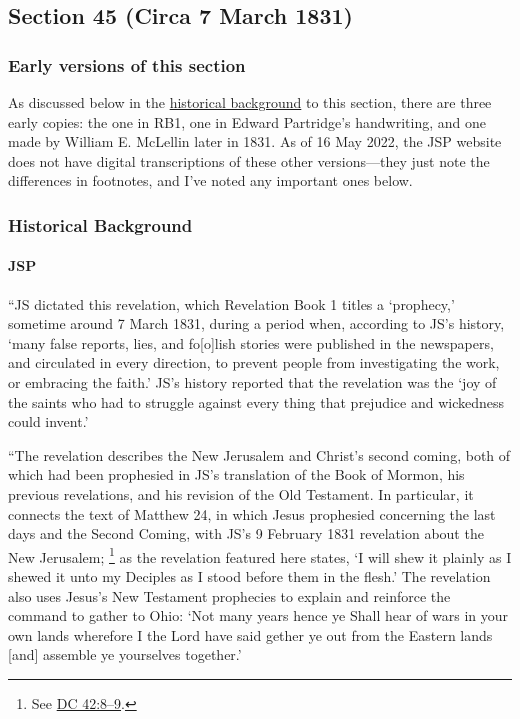 \subsection{Section 45 (Circa 7 March 1831)}
	\label{DC45}
	
	\subsubsection{Early versions of this section}
	
		As discussed below in the \hyperref[DC45-HB]{historical background} to this section, there are three early copies: the one in RB1, one in Edward Partridge's handwriting, and one made by William E. McLellin later in 1831. As of 16 May 2022, the JSP website does not have digital transcriptions of these other versions---they just note the differences in footnotes, and I've noted any important ones below.
	
	\subsubsection{Historical Background}
		\label{DC45-HB}
		
		\paragraph{JSP}
		
			``JS dictated this revelation, which Revelation Book 1 titles a `prophecy,' sometime around 7 March 1831, during a period when, according to JS's history, `many false reports, lies, and fo[o]lish stories were published in the newspapers, and circulated in every direction, to prevent people from investigating the work, or embracing the faith.' JS's history reported that the revelation was the `joy of the saints who had to struggle against every thing that prejudice and wickedness could invent.'
			
			``The revelation describes the New Jerusalem and Christ's second coming, both of which had been prophesied in JS's translation of the Book of Mormon, his previous revelations, and his revision of the Old Testament. In particular, it connects the text of Matthew 24, in which Jesus prophesied concerning the last days and the Second Coming, with JS's 9 February 1831 revelation about the New Jerusalem;%
				\footnote{%
					See \hyperref[DC42-8]{DC 42:8--9}.
					}
			as the revelation featured here states, `I will shew it plainly as I shewed it unto my Deciples as I stood before them in the flesh.' The revelation also uses Jesus's New Testament prophecies to explain and reinforce the command to gather to Ohio: `Not many years hence ye Shall hear of wars in your own lands wherefore I the Lord have said gether ye out from the Eastern lands [and] assemble ye yourselves together.'
			
